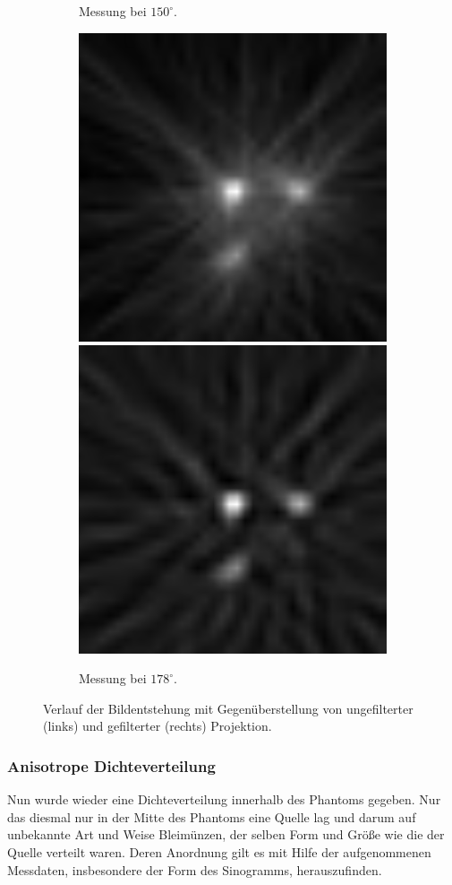 \documentclass[slug=PET, room=Andreas-Schubert-Bau\,\ 424A, supervisor=Carsten\ Bittrich, coursedate=10.\ 01.\ 2020]{../../Lab_Report_LaTeX/lab_report}
\begin{document}
\begin{figure}
\begin{subfigure}{0.5\textwidth}
		\caption{Messung bei \(150^\circ\).}
	\end{subfigure}
	\begin{subfigure}{0.5\textwidth}
		\centering
		\includegraphics[width=.4\textwidth]{../messungen/oliTOM1/15_einfach.png}
		\includegraphics[width=.4\textwidth]{../messungen/oliTOM1/15_gefiltert.png}
		\caption{Messung bei \(178^\circ\).}
	\end{subfigure}
	\caption{Verlauf der Bildentstehung mit Gegenüberstellung von ungefilterter (links) und gefilterter (rechts) Projektion.}
	\label{fig:tom1}
\end{figure}

\subsubsection{Anisotrope Dichteverteilung}
\label{sec:tom2}

Nun wurde wieder eine Dichteverteilung innerhalb des Phantoms gegeben. Nur das diesmal nur in der
Mitte des Phantoms eine Quelle lag und darum auf unbekannte Art und Weise Bleimünzen, der selben
Form und Größe wie die der Quelle verteilt waren. Deren Anordnung gilt es mit Hilfe der
aufgenommenen Messdaten, insbesondere der Form des Sinogramms, herauszufinden.
\end{document}
